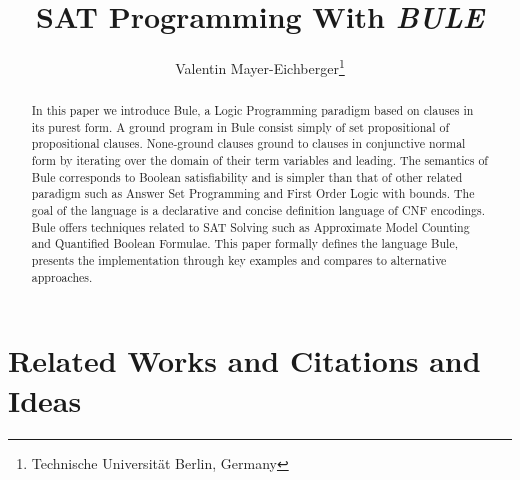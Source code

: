 \documentclass{new_tlp}
\title{ SAT Programming With \emph{BULE}}
\author{
    Valentin Mayer-Eichberger\footnote{Technische Universit\"at Berlin, Germany} 
}
\begin{document}
\maketitle


\begin{abstract}
    In this paper we introduce Bule, a Logic Programming paradigm based on clauses in its purest form. 
    A ground program in Bule consist simply of set propositional of propositional clauses. 
    None-ground clauses ground to clauses in conjunctive normal form by iterating over the domain of their term variables and leading. 
    The semantics of Bule corresponds to Boolean satisfiability and is simpler than that of other related paradigm such as Answer Set Programming and First Order Logic with bounds.  
    The goal of the language is a declarative and concise definition language of CNF encodings. 
    Bule offers techniques related to SAT Solving such as Approximate Model Counting and Quantified Boolean Formulae. 
    This paper formally defines the language Bule, presents the implementation through key examples and compares to alternative approaches. 




\end{abstract}

\section{Related Works and Citations and Ideas}
\end{document}
